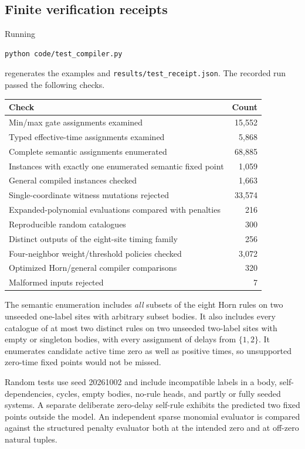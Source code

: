 \documentclass[11pt,letterpaper]{article}
\theoremstyle{definition}
\theoremstyle{remark}
\newcommand{\code}[1]{\nolinkurl{#1}}
\begin{document}
\subsection{Finite verification receipts}
Running
\begin{verbatim}
python code/test_compiler.py
\end{verbatim}
regenerates the examples and \code{results/test_receipt.json}. The recorded
run passed the following checks.
\begin{center}\small
\begin{tabular}{lr}
\toprule
Check & Count\\\midrule
Min/max gate assignments examined & 15,552\\
Typed effective-time assignments examined & 5,868\\
Complete semantic assignments enumerated & 68,885\\
Instances with exactly one enumerated semantic fixed point & 1,059\\
General compiled instances checked & 1,663\\
Single-coordinate witness mutations rejected & 33,574\\
Expanded-polynomial evaluations compared with penalties & 216\\
Reproducible random catalogues & 300\\
Distinct outputs of the eight-site timing family & 256\\
Four-neighbor weight/threshold policies checked & 3,072\\
Optimized Horn/general compiler comparisons & 320\\
Malformed inputs rejected & 7\\\bottomrule
\end{tabular}
\end{center}

The semantic enumeration includes \emph{all} subsets of the eight Horn
rules on two unseeded one-label sites with arbitrary subset bodies. It
also includes every catalogue of at most two distinct rules on two
unseeded two-label sites with empty or singleton bodies, with every
assignment of delays from $\{1,2\}$. It enumerates candidate active time
zero as well as positive times, so unsupported zero-time fixed points
would not be missed.

Random tests use seed 20261002 and include incompatible labels in a body,
self-dependencies, cycles, empty bodies, no-rule heads, and partly or
fully seeded systems. A separate deliberate zero-delay self-rule exhibits
the predicted two fixed points outside the model. An independent sparse
monomial evaluator is compared against the structured penalty evaluator
both at the intended zero and at off-zero natural tuples.
\end{document}
